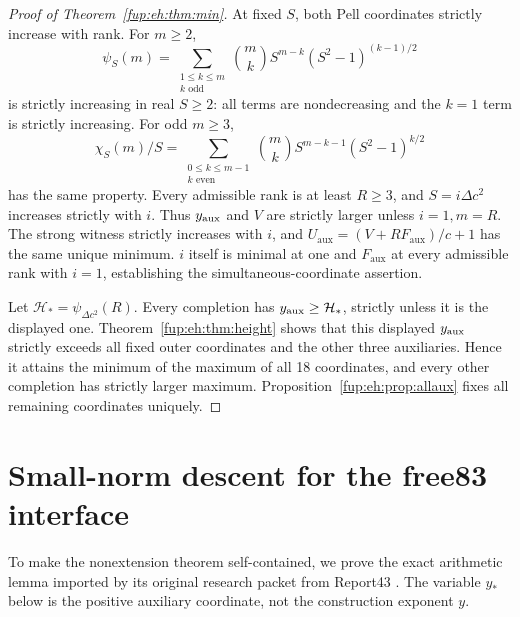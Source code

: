 \documentclass[11pt,letterpaper]{article}
\theoremstyle{definition}\newtheorem{definition}[theorem]{Definition}
\theoremstyle{remark}\newtheorem{remark}[theorem]{Remark}
\newcommand{\D}{\Delta}
\newcommand{\Fa}{F_{\mathrm{aux}}}\newcommand{\Ua}{U_{\mathrm{aux}}}\newcommand{\ttt}{t_{\mathrm{tr}}}
\begin{document}
\begin{proof}[Proof of Theorem~\ref{fup:eh:thm:min}]
At fixed $S$, both Pell coordinates strictly increase with rank.
For $m\ge2$,
\[
 \psi_S(m)=\sum_{\substack{1\le k\le m\\k\text{ odd}}}
 \binom mk S^{m-k}(S^2-1)^{(k-1)/2}
\]
is strictly increasing in real $S\ge2$: all terms are nondecreasing
and the $k=1$ term is strictly increasing. For odd $m\ge3$,
\[
 \chi_S(m)/S=\sum_{\substack{0\le k\le m-1\\k\text{ even}}}
 \binom mk S^{m-k-1}(S^2-1)^{k/2}
\]
has the same property. Every admissible rank is at least $R\ge3$,
and $S=i\D c^2$ increases strictly with $i$.
Thus $y_{\mathrm{aux}}$ and $V$ are strictly larger unless $i=1,m=R$.
The strong witness strictly increases with $i$, and
$\Ua=(V+R\Fa)/c+1$ has the same unique minimum.
$i$ itself is minimal at one and $\Fa$ at every admissible rank
with $i=1$, establishing the simultaneous-coordinate assertion.

Let $\mathcal H_*=\psi_{\D c^2}(R)$. Every completion has
$y_{\mathrm{aux}}\ge\mathcal H_*$, strictly unless it is the displayed one.
Theorem~\ref{fup:eh:thm:height} shows that this displayed $y_{\mathrm{aux}}$ strictly
exceeds all fixed outer coordinates and the other three auxiliaries.
Hence it attains the minimum of the maximum of all 18 coordinates,
and every other completion has strictly larger maximum.
Proposition~\ref{fup:eh:prop:allaux} fixes all remaining coordinates uniquely.
\end{proof}

\section{Small-norm descent for the free83 interface}
\label{fup:eh:sec:smallnorm}
To make the nonextension theorem self-contained, we prove the exact
arithmetic lemma imported by its original research packet from
Report43 \cite{fup:eh:smallnorm,fup:eh:freeaudit}. The variable $y_*$ below is the
positive auxiliary coordinate, not the construction exponent $y$.
\end{document}
